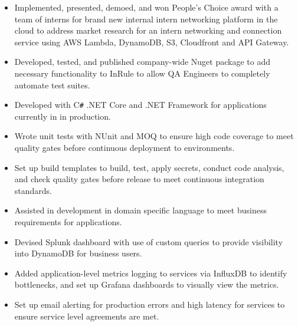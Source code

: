 \documentclass[overlapped]{res}
\begin{document}
\begin{resume}
\begin{itemize}
                  \item Implemented, presented, demoed, and won People's Choice
                   award with a team of interns for brand new internal intern
                   networking platform in the cloud to
                   address market research for an intern
                   networking and connection service using
                   AWS Lambda, DynamoDB, S3, Cloudfront and API Gateway.

                  \item Developed, tested, and published
                  company-wide Nuget package to add
                  necessary functionality to InRule
                  to allow QA Engineers to completely automate test suites.

                  \item Developed with C\texttt{\#} .NET Core and .NET Framework
                  for applications currently in in production.

                  \item Wrote unit tests with NUnit and MOQ to ensure high code coverage
                  to meet quality gates before continuous deployment
                   to environments.

                  \item Set up build templates to build,
                  test, apply secrets, conduct code analysis,
                  and check quality gates before release to meet
                  continuous integration standards.

                  \item Assisted in development in domain
                  specific language to meet business requirements for applications.

                  \item Devised Splunk dashboard with use of
                  custom queries to provide
                   visibility into DynamoDB for business users.

                  \item Added application-level
                  metrics logging to services via InfluxDB to identify bottlenecks,
                  and set up Grafana dashboards to visually view the metrics.

                  \item Set up email alerting for production errors and high latency
                  for services to ensure service level agreements are met.


\end{itemize}
\end{resume}
\end{document}
